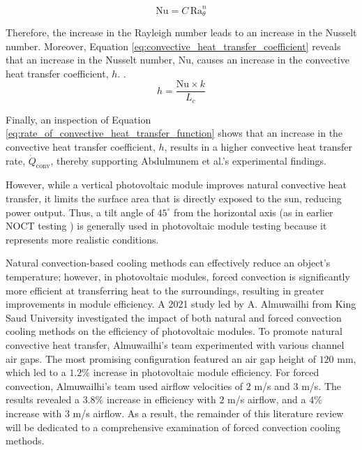 \begin{equation}
    \text{Nu} = C\,\text{Ra}_\theta^n
    \label{eq:avg_nusselt_number_natural_convection}
\end{equation}

Therefore, the increase in the Rayleigh number leads to an increase in the Nusselt number. Moreover, Equation \ref{eq:convective_heat_transfer_coefficient} reveals that an increase in the Nusselt number, $\text{Nu}$, causes an increase in the convective heat transfer coefficient, $h$. \cite{Cengel2014NaturalConvection}.
\begin{equation}
    h = \frac{\text{Nu} \times k}{L_c}
    \label{eq:convective_heat_transfer_coefficient}
\end{equation}

Finally, an inspection of Equation \ref{eq:rate_of_convective_heat_transfer_function} shows that an increase in the convective heat transfer coefficient, $h$, results in a higher convective heat transfer rate, $\dot{Q}_\text{conv}$, thereby supporting Abdulmunem et al.'s experimental findings. \cite{Cengel2014IntroductionConcepts} \vspace{0.5em}

However, while a vertical photovoltaic module improves natural convective heat transfer, it limits the surface area that is directly exposed to the sun, reducing power output. Thus, a tilt angle of $45^\circ$ from the horizontal axis (as in earlier NOCT testing \cite{InternationalElectrotechnicalCommission2005IECApproval}) is generally used in photovoltaic module testing because it represents more realistic conditions.\vspace{0.5em}

Natural convection-based cooling methods can effectively reduce an object's temperature; however, in photovoltaic modules, forced convection is significantly more efficient at transferring heat to the surroundings, resulting in greater improvements in module efficiency. A 2021 study led by A. Almuwailhi from King Saud University investigated the impact of both natural and forced convection cooling methods on the efficiency of photovoltaic modules. To promote natural convective heat transfer, Almuwailhi's team experimented with various channel air gaps. The most promising configuration featured an air gap height of $120$ mm, which led to a $1.2\%$ increase in photovoltaic module efficiency. For forced convection, Almuwailhi's team used airflow velocities of $2$ m/s and $3$ m/s. The results revealed a $3.8\%$ increase in efficiency with $2$ m/s airflow, and a $4\%$ increase with $3$ m/s airflow. \cite{Almuwailhi2023InvestigatingRiyadh} As a result, the remainder of this literature review will be dedicated to a comprehensive examination of forced convection cooling methods.

